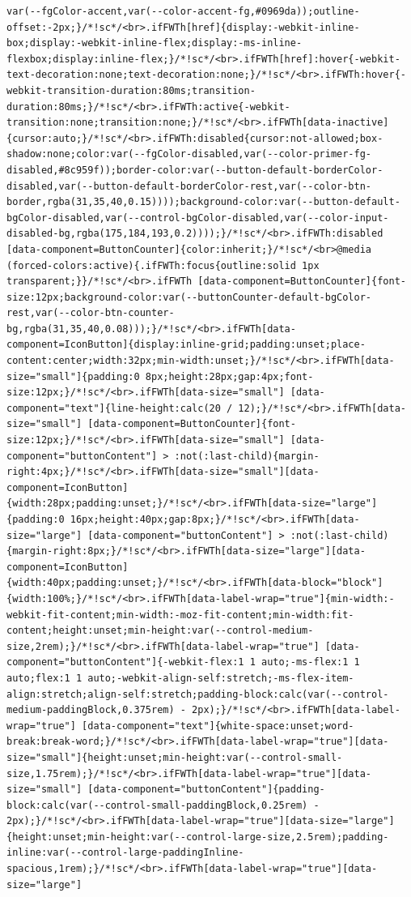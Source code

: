 \documentclass[
  letterpaper,
]{book}
\begin{document}
\begin{verbatim}
var(--fgColor-accent,var(--color-accent-fg,#0969da));outline-offset:-2px;}/*!sc*/<br>.ifFWTh[href]{display:-webkit-inline-box;display:-webkit-inline-flex;display:-ms-inline-flexbox;display:inline-flex;}/*!sc*/<br>.ifFWTh[href]:hover{-webkit-text-decoration:none;text-decoration:none;}/*!sc*/<br>.ifFWTh:hover{-webkit-transition-duration:80ms;transition-duration:80ms;}/*!sc*/<br>.ifFWTh:active{-webkit-transition:none;transition:none;}/*!sc*/<br>.ifFWTh[data-inactive]{cursor:auto;}/*!sc*/<br>.ifFWTh:disabled{cursor:not-allowed;box-shadow:none;color:var(--fgColor-disabled,var(--color-primer-fg-disabled,#8c959f));border-color:var(--button-default-borderColor-disabled,var(--button-default-borderColor-rest,var(--color-btn-border,rgba(31,35,40,0.15))));background-color:var(--button-default-bgColor-disabled,var(--control-bgColor-disabled,var(--color-input-disabled-bg,rgba(175,184,193,0.2))));}/*!sc*/<br>.ifFWTh:disabled [data-component=ButtonCounter]{color:inherit;}/*!sc*/<br>@media (forced-colors:active){.ifFWTh:focus{outline:solid 1px transparent;}}/*!sc*/<br>.ifFWTh [data-component=ButtonCounter]{font-size:12px;background-color:var(--buttonCounter-default-bgColor-rest,var(--color-btn-counter-bg,rgba(31,35,40,0.08)));}/*!sc*/<br>.ifFWTh[data-component=IconButton]{display:inline-grid;padding:unset;place-content:center;width:32px;min-width:unset;}/*!sc*/<br>.ifFWTh[data-size="small"]{padding:0 8px;height:28px;gap:4px;font-size:12px;}/*!sc*/<br>.ifFWTh[data-size="small"] [data-component="text"]{line-height:calc(20 / 12);}/*!sc*/<br>.ifFWTh[data-size="small"] [data-component=ButtonCounter]{font-size:12px;}/*!sc*/<br>.ifFWTh[data-size="small"] [data-component="buttonContent"] > :not(:last-child){margin-right:4px;}/*!sc*/<br>.ifFWTh[data-size="small"][data-component=IconButton]{width:28px;padding:unset;}/*!sc*/<br>.ifFWTh[data-size="large"]{padding:0 16px;height:40px;gap:8px;}/*!sc*/<br>.ifFWTh[data-size="large"] [data-component="buttonContent"] > :not(:last-child){margin-right:8px;}/*!sc*/<br>.ifFWTh[data-size="large"][data-component=IconButton]{width:40px;padding:unset;}/*!sc*/<br>.ifFWTh[data-block="block"]{width:100%;}/*!sc*/<br>.ifFWTh[data-label-wrap="true"]{min-width:-webkit-fit-content;min-width:-moz-fit-content;min-width:fit-content;height:unset;min-height:var(--control-medium-size,2rem);}/*!sc*/<br>.ifFWTh[data-label-wrap="true"] [data-component="buttonContent"]{-webkit-flex:1 1 auto;-ms-flex:1 1 auto;flex:1 1 auto;-webkit-align-self:stretch;-ms-flex-item-align:stretch;align-self:stretch;padding-block:calc(var(--control-medium-paddingBlock,0.375rem) - 2px);}/*!sc*/<br>.ifFWTh[data-label-wrap="true"] [data-component="text"]{white-space:unset;word-break:break-word;}/*!sc*/<br>.ifFWTh[data-label-wrap="true"][data-size="small"]{height:unset;min-height:var(--control-small-size,1.75rem);}/*!sc*/<br>.ifFWTh[data-label-wrap="true"][data-size="small"] [data-component="buttonContent"]{padding-block:calc(var(--control-small-paddingBlock,0.25rem) - 2px);}/*!sc*/<br>.ifFWTh[data-label-wrap="true"][data-size="large"]{height:unset;min-height:var(--control-large-size,2.5rem);padding-inline:var(--control-large-paddingInline-spacious,1rem);}/*!sc*/<br>.ifFWTh[data-label-wrap="true"][data-size="large"] 
\end{verbatim}
\end{document}
